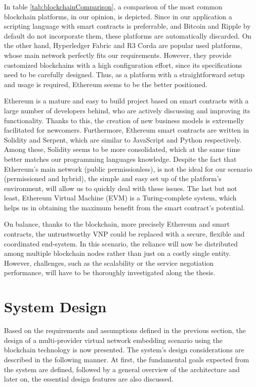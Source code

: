 In table \ref{tab:blockchainComparison}, a comparison of the most common blockchain platforms, in our opinion, is depicted. Since in our application a scripting language with smart contracts is preferrable, and Bitcoin and Ripple by default do not incorporate them, these platforms are automatically discarded. On the other hand, Hyperledger Fabric and R3 Corda are popular used platforms, whose main network perfectly fits our requirements. However, they provide customized blockchains with a high configuration effort, since its specifications need to be carefully designed. Thus, as a platform with a straightforward setup and usage is required, Ethereum seems to be the better positioned.

Ethereum is a mature and easy to build project based on smart contracts with a large number of developers behind, who are actively discussing and improving its functionality. Thanks to this, the creation of new business models is extremelly facilitated for newcomers. Furthermore, Ethereum smart contracts are written in Solidity and Serpent, which are similar to JavaScript and Python respectively. Among these, Solidity seems to be more consolidated, which at the same time better matches our programming languages knowledge. Despite the fact that Ethereum's main network (public permissionless), is not the ideal for our scenario (permissioned and hybrid), the simple and easy set up of the platform's environment, will allow us to quickly deal with these issues. The last but not least, Ethereum Virtual Machine (EVM) is a Turing-complete system, which helps us in obtaining the maximum benefit from the smart contract's potential.

On balance, thanks to the blockchain, more precisely Ethereum and smart contracts, the untrustworthy VNP could be replaced with a secure, flexible and coordinated end-system. In this scenario, the reliance will now be distributed among multiple blockchain nodes rather than just on a costly single entity. However, challenges, such as the scalability or the service negotiation performance, will have to be thoroughly investigated along the thesis.

\section{System Design}

Based on the requirements and assumptions defined in the previous section, the design of a multi-provider virtual network embedding scenario using the blockchain technology is now presented. The system's design considerations are described in the following manner. At first, the fundamental goals expected from the system are defined, followed by a general overview of the architecture and later on, the essential design features are also discussed.

